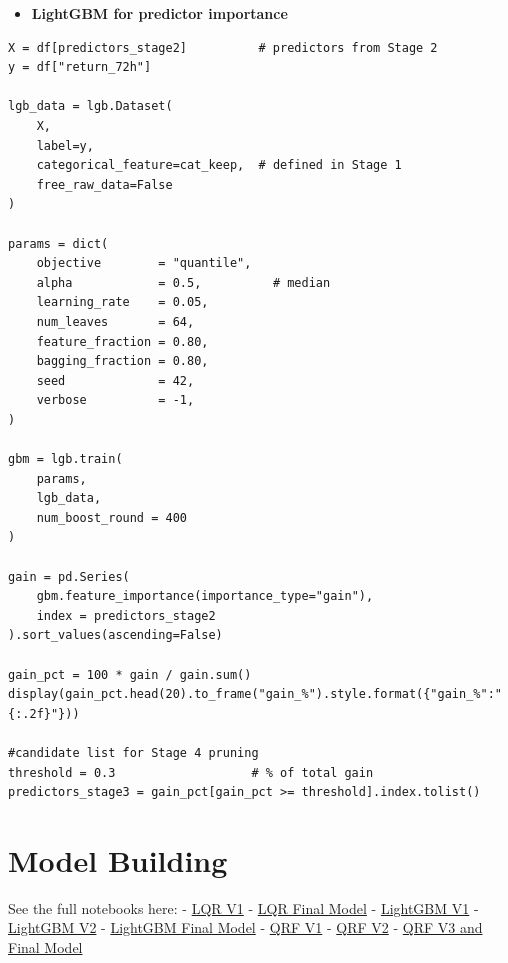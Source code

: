 \documentclass[
  a4paper,
  DIV=11,
  numbers=noendperiod]{scrreprt}
\providecommand{\tightlist}{%
  \setlength{\itemsep}{0pt}\setlength{\parskip}{0pt}}
\begin{document}
\begin{itemize}
\tightlist
\item
  \textbf{LightGBM for predictor importance}
\end{itemize}

\begin{verbatim}
X = df[predictors_stage2]          # predictors from Stage 2
y = df["return_72h"]

lgb_data = lgb.Dataset(
    X,
    label=y,
    categorical_feature=cat_keep,  # defined in Stage 1
    free_raw_data=False
)

params = dict(
    objective        = "quantile",
    alpha            = 0.5,          # median
    learning_rate    = 0.05,
    num_leaves       = 64,
    feature_fraction = 0.80,
    bagging_fraction = 0.80,
    seed             = 42,
    verbose          = -1,
)

gbm = lgb.train(
    params,
    lgb_data,
    num_boost_round = 400
)

gain = pd.Series(
    gbm.feature_importance(importance_type="gain"),
    index = predictors_stage2
).sort_values(ascending=False)

gain_pct = 100 * gain / gain.sum()
display(gain_pct.head(20).to_frame("gain_%").style.format({"gain_%":"{:.2f}"}))

#candidate list for Stage 4 pruning
threshold = 0.3                   # % of total gain
predictors_stage3 = gain_pct[gain_pct >= threshold].index.tolist()
\end{verbatim}

\section{Model Building}\label{model-building-2}

See the full notebooks here: -
\href{https://github.com/KetchupJL/solana-qrf-interval-forecasting/blob/main/notebooks/Model\%20Building/01_baseline_LQR.ipynb}{LQR
V1} -
\href{https://github.com/KetchupJL/solana-qrf-interval-forecasting/blob/main/notebooks/Model\%20Building/012_baseline_QLR.ipynb}{LQR
Final Model} -
\href{https://github.com/KetchupJL/solana-qrf-interval-forecasting/blob/main/notebooks/Model\%20Building/02_baseline_lightgbm.ipynb}{LightGBM
V1} -
\href{https://github.com/KetchupJL/solana-qrf-interval-forecasting/blob/main/notebooks/Model\%20Building/02_lightgbm_v2.ipynb}{LightGBM
V2} -
\href{https://github.com/KetchupJL/solana-qrf-interval-forecasting/blob/main/notebooks/Model\%20Building/02_lightgbm_v3.ipynb}{LightGBM
Final Model} -
\href{https://github.com/KetchupJL/solana-qrf-interval-forecasting/blob/main/notebooks/Model\%20Building/03_QRF_v1.ipynb}{QRF
V1} -
\href{https://github.com/KetchupJL/solana-qrf-interval-forecasting/blob/main/notebooks/Model\%20Building/03_QRF_v2.ipynb}{QRF
V2} -
\href{https://github.com/KetchupJL/solana-qrf-interval-forecasting/blob/main/notebooks/Model\%20Building/03_QRF_v3_tuned.ipynb}{QRF
V3 and Final Model}
\end{document}
